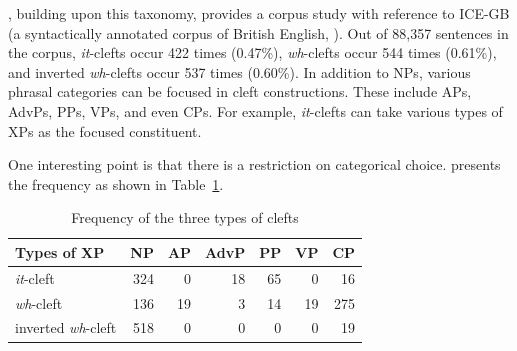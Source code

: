 

\noindent \citet{kim:07}, building upon this taxonomy, provides a
corpus study with reference to ICE-GB (a syntactically annotated
corpus of British English, \citealt{nelson:etal:02}). Out of 88,357
sentences in the corpus, \textit{it}-clefts occur 422 times (0.47\%),
\textit{wh}-clefts occur 544 times (0.61\%), and inverted
\textit{wh}-clefts occur 537 times (0.60\%). In addition to NPs,
various phrasal categories can be focused in cleft
constructions. These include APs, AdvPs, PPs, VPs, and even CPs. For
example, \textit{it}-clefts can take various types of XPs as the
focused constituent.





\noindent One interesting point is that there is a restriction on
categorical choice. \citet[220--223]{kim:07} presents the
frequency as shown in Table~\ref{tbl:freq:cleft}.


\begin{table}[!h]
\caption{Frequency of the three types of clefts \citep{kim:07}}   
\centering
\begin{tabular}{|l||r|r|r|r|r|r|}
\hline
Types of XP & NP & AP & AdvP & PP & VP & CP \\
\hline
\textit{it}-cleft & 324 & 0 & 18 & 65 & 0 & 16 \\
\hline
\textit{wh}-cleft & 136 & 19 & 3 & 14 & 19 & 275 \\
\hline
inverted \textit{wh}-cleft & 518 & 0 & 0 & 0 & 0 & 19 \\
\hline
\end{tabular}
\label{tbl:freq:cleft}
\end{table}

